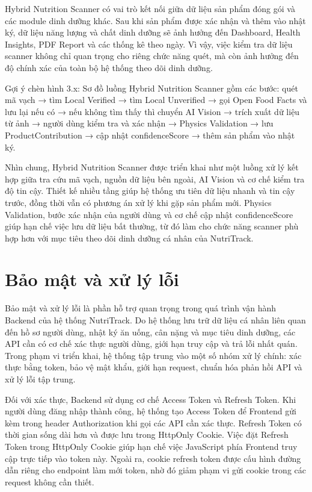 \documentclass[12pt, a4paper]{report}
\begin{document}
Hybrid Nutrition Scanner có vai trò kết nối giữa dữ liệu sản phẩm đóng gói và các module dinh dưỡng khác. Sau khi sản phẩm được xác nhận và thêm vào nhật ký, dữ liệu năng lượng và chất dinh dưỡng sẽ ảnh hưởng đến Dashboard, Health Insights, PDF Report và các thống kê theo ngày. Vì vậy, việc kiểm tra dữ liệu scanner không chỉ quan trọng cho riêng chức năng quét, mà còn ảnh hưởng đến độ chính xác của toàn bộ hệ thống theo dõi dinh dưỡng.

Gợi ý chèn hình 3.x: Sơ đồ luồng Hybrid Nutrition Scanner gồm các bước: quét mã vạch → tìm Local Verified → tìm Local Unverified → gọi Open Food Facts và lưu lại nếu có → nếu không tìm thấy thì chuyển AI Vision → trích xuất dữ liệu từ ảnh → người dùng kiểm tra và xác nhận → Physics Validation → lưu ProductContribution → cập nhật confidenceScore → thêm sản phẩm vào nhật ký.

Nhìn chung, Hybrid Nutrition Scanner được triển khai như một luồng xử lý kết hợp giữa tra cứu mã vạch, nguồn dữ liệu bên ngoài, AI Vision và cơ chế kiểm tra độ tin cậy. Thiết kế nhiều tầng giúp hệ thống ưu tiên dữ liệu nhanh và tin cậy trước, đồng thời vẫn có phương án xử lý khi gặp sản phẩm mới. Physics Validation, bước xác nhận của người dùng và cơ chế cập nhật confidenceScore giúp hạn chế việc lưu dữ liệu bất thường, từ đó làm cho chức năng scanner phù hợp hơn với mục tiêu theo dõi dinh dưỡng cá nhân của NutriTrack.
\section{Bảo mật và xử lý lỗi}Bảo mật và xử lý lỗi là phần hỗ trợ quan trọng trong quá trình vận hành Backend của hệ thống NutriTrack. Do hệ thống lưu trữ dữ liệu cá nhân liên quan đến hồ sơ người dùng, nhật ký ăn uống, cân nặng và mục tiêu dinh dưỡng, các API cần có cơ chế xác thực người dùng, giới hạn truy cập và trả lỗi nhất quán. Trong phạm vi triển khai, hệ thống tập trung vào một số nhóm xử lý chính: xác thực bằng token, bảo vệ mật khẩu, giới hạn request, chuẩn hóa phản hồi API và xử lý lỗi tập trung.

Đối với xác thực, Backend sử dụng cơ chế Access Token và Refresh Token. Khi người dùng đăng nhập thành công, hệ thống tạo Access Token để Frontend gửi kèm trong header Authorization khi gọi các API cần xác thực. Refresh Token có thời gian sống dài hơn và được lưu trong HttpOnly Cookie. Việc đặt Refresh Token trong HttpOnly Cookie giúp hạn chế việc JavaScript phía Frontend truy cập trực tiếp vào token này. Ngoài ra, cookie refresh token được cấu hình đường dẫn riêng cho endpoint làm mới token, nhờ đó giảm phạm vi gửi cookie trong các request không cần thiết.
\end{document}
